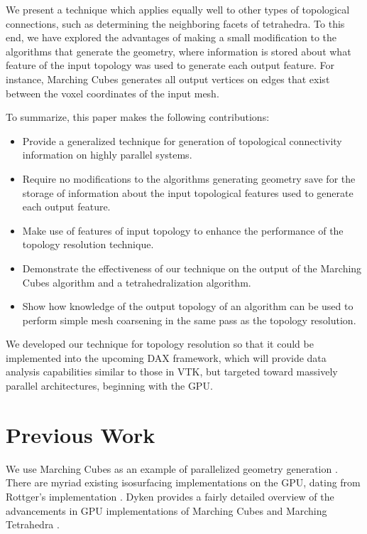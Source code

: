 \documentclass[10pt,journal,cspaper,compsoc]{IEEEtran}
\begin{document}
We present a technique which applies equally well to other types of topological 
connections, such as determining the neighboring facets of tetrahedra. To this end, we have
explored the advantages of making a small modification to the algorithms that generate the
geometry, where information is stored about what feature of the input topology was used to generate
each output feature. For instance, Marching Cubes generates all output vertices on edges that
exist between the voxel coordinates of the input mesh.

To summarize, this paper makes the following contributions:
\begin{itemize}
	\item{Provide a generalized technique for generation of topological connectivity information on highly parallel systems.}
	\item{Require no modifications to the algorithms generating geometry save for the
		storage of information about the input topological features used to generate each output feature.}

	\item{Make use of features of input topology to enhance the performance of the topology
		resolution technique.}

	\item{Demonstrate the effectiveness of our technique on the output of the Marching Cubes
		algorithm and a tetrahedralization algorithm.}
 
	\item{Show how knowledge of the output topology of an algorithm can be used to perform
		 simple mesh coarsening in the same pass as the topology resolution.}
 
\end{itemize}

We developed our technique for topology resolution so that it could be implemented
into the upcoming DAX framework, which will provide data analysis capabilities similar to those
in VTK, but targeted toward massively parallel architectures, beginning with the GPU.

\section{Previous Work}

We use Marching Cubes as an example of parallelized geometry 
generation \cite{Lorensen1987}. There are myriad existing isosurfacing implementations on the GPU, dating from 
Rottger's implementation \cite{Rottger2000}. Dyken provides a fairly 
detailed overview of the advancements in GPU implementations of Marching Cubes and 
Marching Tetrahedra \cite{Dyken2008} .
\end{document}
